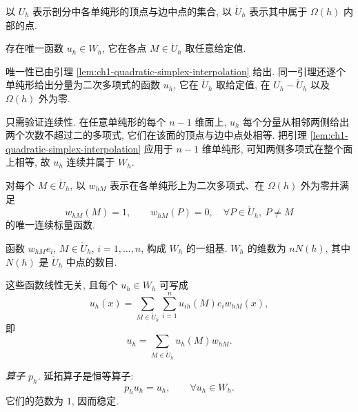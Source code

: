 以 $U_h$ 表示剖分中各单纯形的顶点与边中点的集合, 以 $\mathring U_h$ 表示其中属于 $\Omega(h)$ 内部的点.

\begin{Lemma}
\label{lem:ch1-global-quadratic-interpolant}
存在唯一函数 $u_h\in W_h$, 它在各点 $M\in\mathring U_h$ 取任意给定值.
\end{Lemma}

\begin{Proof}
唯一性已由引理 \ref{lem:ch1-quadratic-simplex-interpolation} 给出. 同一引理还逐个单纯形给出分量为二次多项式的函数 $u_h$, 它在 $\mathring U_h$ 取给定值, 在 $U_h-\mathring U_h$ 以及 $\Omega(h)$ 外为零.

只需验证连续性. 在任意单纯形的每个 $n-1$ 维面上, $u_h$ 每个分量从相邻两侧给出两个次数不超过二的多项式, 它们在该面的顶点与边中点处相等. 把引理 \ref{lem:ch1-quadratic-simplex-interpolation} 应用于 $n-1$ 维单纯形, 可知两侧多项式在整个面上相等, 故 $u_h$ 连续并属于 $W_h$.
\end{Proof}

对每个 $M\in\mathring U_h$, 以 $w_{hM}$ 表示在各单纯形上为二次多项式、在 $\Omega(h)$ 外为零并满足
\begin{equation}
w_{hM}(M)=1,\qquad
w_{hM}(P)=0,\quad\forall P\in\mathring U_h,\ P\neq M
\label{eq:ch1-quadratic-nodal-basis-function}
\end{equation}
的唯一连续标量函数.

\begin{Lemma}
\label{lem:ch1-quadratic-wh-basis}
函数 $w_{hM}e_i$, $M\in\mathring U_h$, $i=1,\ldots,n$, 构成 $W_h$ 的一组基. $W_h$ 的维数为 $nN(h)$, 其中 $N(h)$ 是 $\mathring U_h$ 中点的数目.
\end{Lemma}

\begin{Proof}
这些函数线性无关, 且每个 $u_h\in W_h$ 可写成
\[
u_h(x)=\sum_{M\in\mathring U_h}\sum_{i=1}^nu_{ih}(M)e_iw_{hM}(x),
\]
即
\begin{equation}
u_h=\sum_{M\in\mathring U_h}u_h(M)w_{hM}.
\label{eq:ch1-quadratic-wh-expansion}
\end{equation}
\end{Proof}

\emph{算子 $p_h$.} 延拓算子是恒等算子:
\begin{equation}
p_hu_h=u_h,\qquad\forall u_h\in W_h.
\label{eq:ch1-quadratic-prolongation}
\end{equation}
它们的范数为 $1$, 因而稳定.


